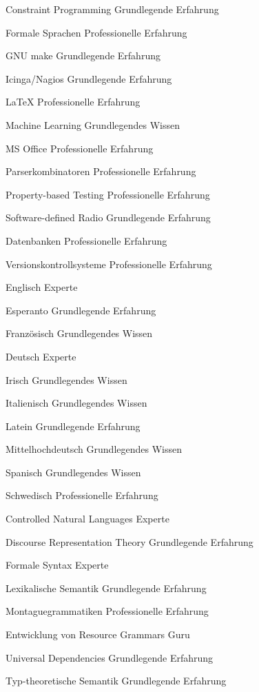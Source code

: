 \documentclass[11pt, a4]{academic-cv}
\begin{document}
\begin{cvskills}
\cvskill
{}
{Constraint Programming}
{Grundlegende Erfahrung}

\cvskill
{}
{Formale Sprachen}
{Professionelle Erfahrung}

\cvskill
{}
{GNU make}
{Grundlegende Erfahrung}

\cvskill
{}
{Icinga/Nagios}
{Grundlegende Erfahrung}

\cvskill
{}
{LaTeX}
{Professionelle Erfahrung}

\cvskill
{}
{Machine Learning}
{Grundlegendes Wissen}

\cvskill
{}
{MS Office}
{Professionelle Erfahrung}

\cvskill
{}
{Parserkombinatoren}
{Professionelle Erfahrung}

\cvskill
{}
{Property-based Testing}
{Professionelle Erfahrung}

\cvskill
{}
{Software-defined Radio}
{Grundlegende Erfahrung}

\cvskill
{}
{Datenbanken}
{Professionelle Erfahrung}

\cvskill
{}
{Versionskontrollsysteme}
{Professionelle Erfahrung}

\end{cvskills}

\begin{cvskills}
\cvskill
{}
{Englisch}
{Experte}

\cvskill
{}
{Esperanto}
{Grundlegende Erfahrung}

\cvskill
{}
{Französisch}
{Grundlegendes Wissen}

\cvskill
{}
{Deutsch}
{Experte}

\cvskill
{}
{Irisch}
{Grundlegendes Wissen}

\cvskill
{}
{Italienisch}
{Grundlegendes Wissen}

\cvskill
{}
{Latein}
{Grundlegende Erfahrung}

\cvskill
{}
{Mittelhochdeutsch}
{Grundlegendes Wissen}

\cvskill
{}
{Spanisch}
{Grundlegendes Wissen}

\cvskill
{}
{Schwedisch}
{Professionelle Erfahrung}

\end{cvskills}

\begin{cvskills}
\cvskill
{}
{Controlled Natural Languages}
{Experte}

\cvskill
{}
{Discourse Representation Theory}
{Grundlegende Erfahrung}

\cvskill
{}
{Formale Syntax}
{Experte}

\cvskill
{}
{Lexikalische Semantik}
{Grundlegende Erfahrung}

\cvskill
{}
{Montaguegrammatiken}
{Professionelle Erfahrung}

\cvskill
{}
{Entwicklung von Resource Grammars}
{Guru}

\cvskill
{}
{Universal Dependencies}
{Grundlegende Erfahrung}

\cvskill
{}
{Typ-theoretische Semantik}
{Grundlegende Erfahrung}

\end{cvskills}
\end{document}
